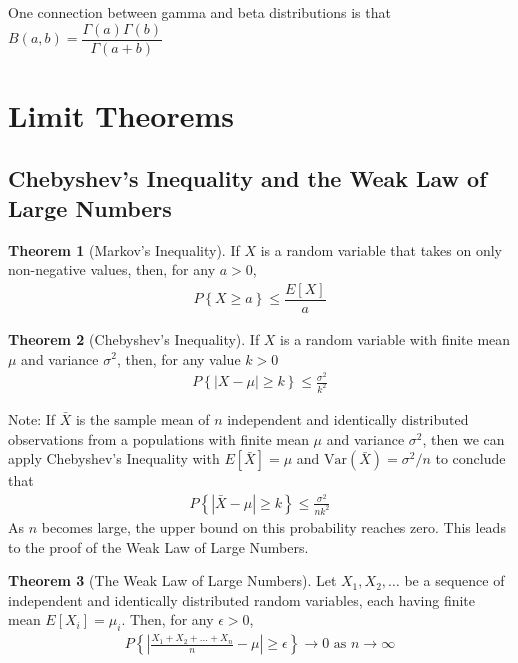 \documentclass[10pt]{article}
\theoremstyle{definition}
\theoremstyle{theorem}
\newtheorem*{theorem}{Theorem}
\begin{document}
		One connection between gamma and beta distributions is that \(B(a,b)=\dfrac{\Gamma(a)\Gamma(b)}{\Gamma(a+b)}\)
		
		\section{Limit Theorems}
		
		\subsection*{Chebyshev's Inequality and the Weak Law of Large Numbers}
		
		\begin{theorem}[Markov's Inequality]
			If \(X\) is a random variable that takes on only non-negative values, then, for any \(a>0\), 
			\begin{align*}
				P\left\{X\geq a\right\} \leq \dfrac{E[X]}{a}
			\end{align*}
			
		\end{theorem}
		
		\begin{theorem}[Chebyshev's Inequality]
			If \(X\) is a random variable with finite mean \(\mu\) and variance \(\sigma^2\), then, for any value \(k>0\)
			\begin{align*}
				P\left\{| X-\mu | \geq k\right\} \leq \frac{\sigma^2}{k^2}
			\end{align*}
		\end{theorem}
		
		Note: If \(\bar{X}\) is the sample mean of \(n\)  independent and identically distributed observations from a populations with finite mean \(\mu\) and variance \(\sigma^2\), then we can apply Chebyshev's Inequality with \(E[\bar{X}]=\mu\) and \(\text{Var}(\bar{X})=\sigma^2/n\) to conclude that
		\begin{align*}
			P\left\{| \bar{X}-\mu | \geq k\right\} \leq \frac{\sigma^2}{nk^2}
		\end{align*}
		As \(n\) becomes large, the upper bound on this probability reaches zero. This leads to the proof of the Weak Law of Large Numbers.
		
		\begin{theorem}[The Weak Law of Large Numbers]
			Let \(X_1, X_2,\ldots\) be a sequence of independent and identically distributed random variables, each having finite mean \(E[X_i]=\mu_i\). Then, for any \(\epsilon > 0\),
			\begin{align*}
				P \left\{ \left|\frac{X_1+X_2+\ldots + X_n}{n}-\mu \right| \geq \epsilon \right\} \to 0 \text{ as } n \to \infty
			\end{align*}
		\end{theorem}
\end{document}
